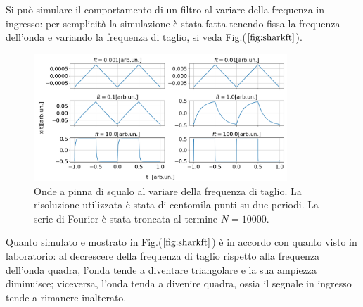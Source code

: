 \documentclass{article}
\begin{document}
                \noindent Si può simulare il comportamento di  un filtro al
                variare della frequenza in ingresso: per semplicità 
                la simulazione è stata fatta tenendo fissa la frequenza dell'onda e 
                variando la frequenza di taglio, si veda Fig.($\ref{fig:sharkft}$).
                    \begin{figure}[H]
                        \centering
                        \includegraphics[width=0.85\textwidth]{fousharkfinsfts1.png} %
                        \caption{Onde a pinna di squalo al variare della frequenza di taglio.
                        La risoluzione utilizzata è stata di centomila punti su due periodi.
                        La serie di Fourier è stata troncata al termine $N=10000$.}
                        \label{fig:sharkft}
                    \end{figure}

                \noindent Quanto simulato e mostrato in Fig.($\ref{fig:sharkft}$)
                è in accordo con quanto visto in laboratorio: 
                al decrescere della frequenza di taglio rispetto alla frequenza dell'onda quadra,
                l'onda tende a diventare triangolare e la sua ampiezza diminuisce; viceversa,
                l'onda tenda a divenire quadra, ossia il segnale in ingresso tende a 
                rimanere inalterato.
            
            
\end{document}
